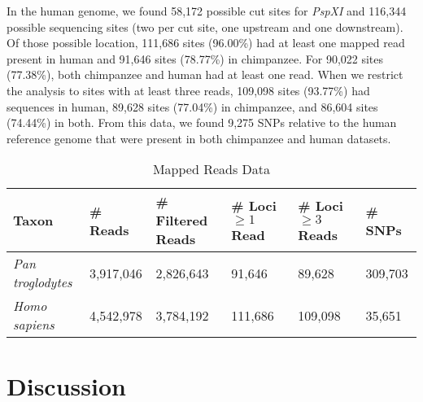 \documentclass[12pt]{article}
\begin{document}
In the human genome, we found 58,172 possible cut sites for \emph{PspXI} and 116,344 possible sequencing sites (two per cut site, one upstream and one downstream). Of those possible location, 111,686 sites (96.00\%) had at least one mapped read present in human and 91,646 sites (78.77\%) in chimpanzee. For 90,022 sites (77.38\%), both chimpanzee and human had at least one read. When we restrict the analysis to sites with at least three reads, 109,098 sites (93.77\%) had sequences in human, 89,628 sites (77.04\%) in chimpanzee, and 86,604 sites (74.44\%) in both. From this data, we found 9,275 SNPs relative to the human reference genome that were present in both chimpanzee and human datasets.

\begin{table}[h]
\caption{Mapped Reads Data}
\begin{center}
	\small
	\begin{tabular}{ p{3cm} || p{1.75cm} | p{1.75cm} || p{1.75cm} | p{1.75cm} | l }
		\hline
		Taxon                  & \# Reads  & \# Filtered Reads & \# Loci $\ge 1$ Read & \# Loci $\ge 3$ Reads & \# SNPs \\ \hline\hline
		\emph{Pan troglodytes} & 3,917,046 & 2,826,643           &  91,646              &  89,628               & 309,703 \\ \hline
		\emph{Homo sapiens}    & 4,542,978 & 3,784,192           & 111,686              & 109,098               &  35,651 \\ \hline
	\end{tabular}
\end{center}
\end{table}


\section{Discussion}
\end{document}
